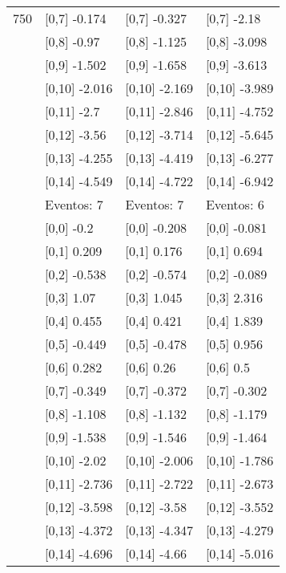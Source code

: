 \begin{table}
\begin{tabular}[t]{llll}
750 & {}[0,7] -0.174 & {}[0,7] -0.327 & {}[0,7] -2.18\\
\addlinespace
 & {}[0,8] -0.97 & {}[0,8] -1.125 & {}[0,8] -3.098\\
 & {}[0,9] -1.502 & {}[0,9] -1.658 & {}[0,9] -3.613\\
 & {}[0,10] -2.016 & {}[0,10] -2.169 & {}[0,10] -3.989\\
 & {}[0,11] -2.7 & {}[0,11] -2.846 & {}[0,11] -4.752\\
 & {}[0,12] -3.56 & {}[0,12] -3.714 & {}[0,12] -5.645\\
\addlinespace
 & {}[0,13] -4.255 & {}[0,13] -4.419 & {}[0,13] -6.277\\
 & {}[0,14] -4.549 & {}[0,14] -4.722 & {}[0,14] -6.942\\
 & Eventos:  7 & Eventos:  7 & Eventos:  6\\
 & {}[0,0] -0.2 & {}[0,0] -0.208 & {}[0,0] -0.081\\
 & {}[0,1] 0.209 & {}[0,1] 0.176 & {}[0,1] 0.694\\
\addlinespace
 & {}[0,2] -0.538 & {}[0,2] -0.574 & {}[0,2] -0.089\\
 & {}[0,3] 1.07 & {}[0,3] 1.045 & {}[0,3] 2.316\\
 & {}[0,4] 0.455 & {}[0,4] 0.421 & {}[0,4] 1.839\\
 & {}[0,5] -0.449 & {}[0,5] -0.478 & {}[0,5] 0.956\\
 & {}[0,6] 0.282 & {}[0,6] 0.26 & {}[0,6] 0.5\\
\addlinespace
1000 & {}[0,7] -0.349 & {}[0,7] -0.372 & {}[0,7] -0.302\\
 & {}[0,8] -1.108 & {}[0,8] -1.132 & {}[0,8] -1.179\\
 & {}[0,9] -1.538 & {}[0,9] -1.546 & {}[0,9] -1.464\\
 & {}[0,10] -2.02 & {}[0,10] -2.006 & {}[0,10] -1.786\\
 & {}[0,11] -2.736 & {}[0,11] -2.722 & {}[0,11] -2.673\\
\addlinespace
 & {}[0,12] -3.598 & {}[0,12] -3.58 & {}[0,12] -3.552\\
 & {}[0,13] -4.372 & {}[0,13] -4.347 & {}[0,13] -4.279\\
 & {}[0,14] -4.696 & {}[0,14] -4.66 & {}[0,14] -5.016\\
\bottomrule
\end{tabular}
\end{table}
